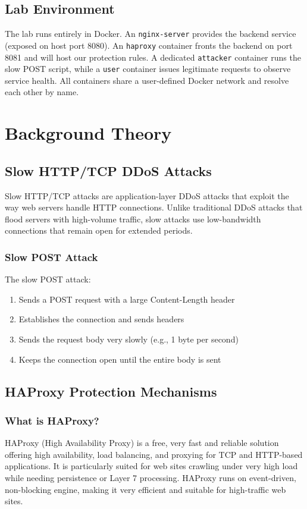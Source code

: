 \documentclass[12pt]{article}
\begin{document}
    \subsection{Lab Environment}
    The lab runs entirely in Docker. An \texttt{nginx-server} provides the backend service (exposed on host port 8080). An \texttt{haproxy} container fronts the backend on port 8081 and will host our protection rules. A dedicated \texttt{attacker} container runs the slow POST script, while a \texttt{user} container issues legitimate requests to observe service health. All containers share a user-defined Docker network and resolve each other by name.

    \section{Background Theory}

    \subsection{Slow HTTP/TCP DDoS Attacks}

    Slow HTTP/TCP attacks are application-layer DDoS attacks that exploit the way web servers handle HTTP connections. Unlike traditional DDoS attacks that flood servers with high-volume traffic, slow attacks use low-bandwidth connections that remain open for extended periods.

    \subsubsection{Slow POST Attack}
    The slow POST attack:
    \begin{enumerate}
        \item Sends a POST request with a large Content-Length header
        \item Establishes the connection and sends headers
        \item Sends the request body very slowly (e.g., 1 byte per second)
        \item Keeps the connection open until the entire body is sent
    \end{enumerate}

    \subsection{HAProxy Protection Mechanisms}

    \subsubsection{What is HAProxy?}
    HAProxy (High Availability Proxy) is a free, very fast and reliable solution offering high availability, load balancing, and proxying for TCP and HTTP-based applications. It is particularly suited for web sites crawling under very high load while needing persistence or Layer 7 processing. HAProxy runs on event-driven, non-blocking engine, making it very efficient and suitable for high-traffic web sites.
\end{document}
